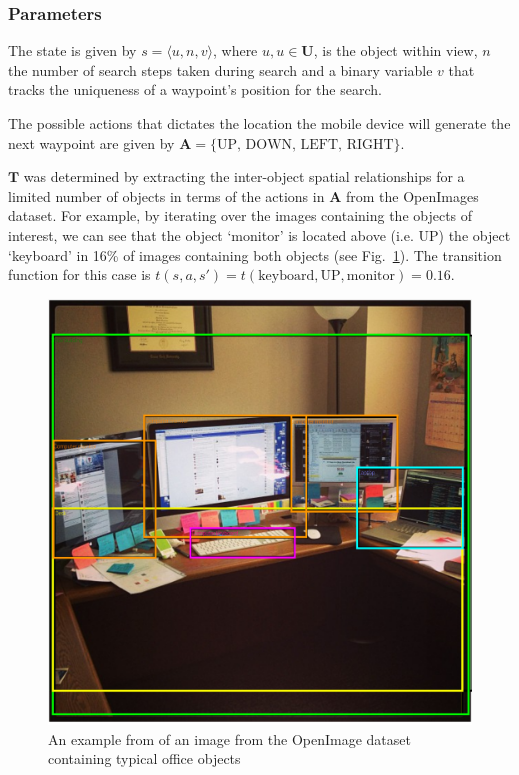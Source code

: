 \documentclass[runningheads]{llncs}
\begin{document}


\subsubsection{Parameters}

The state is given by $s = \langle u, n, v \rangle$, where $u, u\in\mathbf{U}$, is the object within view, $n$ the number of search steps taken during search and a binary variable $v$ that tracks the uniqueness of a waypoint's position for the search.

The possible actions that dictates the location the mobile device will generate the next waypoint are given by $\mathbf{A} = \{ \textrm{UP, DOWN, LEFT, RIGHT} \}$.

$\mathbf{T}$ was determined by extracting the inter-object spatial relationships for a limited number of objects in terms of the actions in $\mathbf{A}$ from the OpenImages~\cite{openimages} dataset. 
For example, by iterating over the images containing the objects of interest, we can see that the object `monitor' is located above (i.e. UP) the object `keyboard' in 16\% of images containing both objects (see Fig.~\ref{fig:openimage}). 
The transition function for this case is $t(s, a, s') = t(\textrm{keyboard}, \textrm{UP}, \textrm{monitor}) = 0.16$.


\begin{figure}
  \centering
  \includegraphics[width=0.4\columnwidth]{figures/desk_example.png}
  \caption{An example from of an image from the OpenImage dataset~\cite{openimages} containing typical office objects}\label{fig:openimage}
\end{figure}
\end{document}
